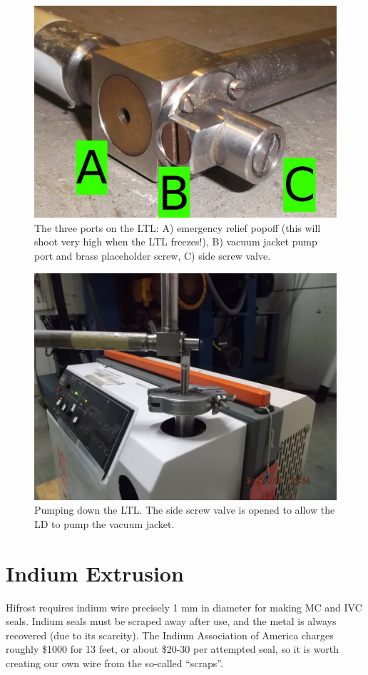 \begin{figure}
 \centering
 \includegraphics[width=.80\linewidth]{img/ltl-ports.jpg}
 \caption{The three ports on the LTL: A) emergency relief popoff (this will shoot very high when the LTL freezes!), B) vacuum jacket pump port and brass placeholder screw, C) side screw valve.}
 \label{fig:ltl-ports}
\end{figure}

\begin{figure}
 \centering
 \includegraphics[width=.8\linewidth]{img/ltl-pumping.jpg}
 \caption{Pumping down the LTL.  The side screw valve is opened to allow the LD to pump the vacuum jacket.}
 \label{fig:ltl-pumping}
\end{figure}



\section{Indium Extrusion}
Hifrost requires indium wire precisely 1 mm in diameter for making MC and IVC seals.  Indium seals must be scraped away after use, and the metal is always recovered (due to its scarcity).  The Indium Association of America charges roughly \$1000 for 13 feet, or about \$20-30 per attempted seal, so it is worth creating our own wire from the so-called ``scraps''.


